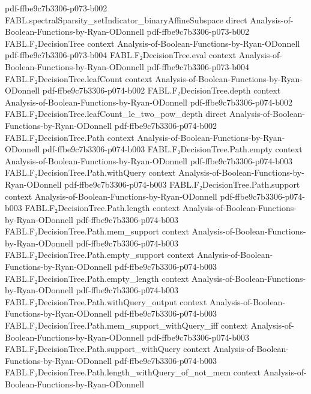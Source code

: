 \begin{theorem}
  {pdf-ffbe9c7b3306-p073-b002}
\proofstep
  {FABL.spectralSparsity_setIndicator_binaryAffineSubspace}
  {direct}
  {Analysis-of-Boolean-Functions-by-Ryan-ODonnell}
  {pdf-ffbe9c7b3306-p073-b002}
\proofstep
  {FABL.F₂DecisionTree}
  {context}
  {Analysis-of-Boolean-Functions-by-Ryan-ODonnell}
  {pdf-ffbe9c7b3306-p073-b004}
\proofstep
  {FABL.F₂DecisionTree.eval}
  {context}
  {Analysis-of-Boolean-Functions-by-Ryan-ODonnell}
  {pdf-ffbe9c7b3306-p073-b004}
\proofstep
  {FABL.F₂DecisionTree.leafCount}
  {context}
  {Analysis-of-Boolean-Functions-by-Ryan-ODonnell}
  {pdf-ffbe9c7b3306-p074-b002}
\proofstep
  {FABL.F₂DecisionTree.depth}
  {context}
  {Analysis-of-Boolean-Functions-by-Ryan-ODonnell}
  {pdf-ffbe9c7b3306-p074-b002}
\proofstep
  {FABL.F₂DecisionTree.leafCount_le_two_pow_depth}
  {direct}
  {Analysis-of-Boolean-Functions-by-Ryan-ODonnell}
  {pdf-ffbe9c7b3306-p074-b002}
\proofstep
  {FABL.F₂DecisionTree.Path}
  {context}
  {Analysis-of-Boolean-Functions-by-Ryan-ODonnell}
  {pdf-ffbe9c7b3306-p074-b003}
\proofstep
  {FABL.F₂DecisionTree.Path.empty}
  {context}
  {Analysis-of-Boolean-Functions-by-Ryan-ODonnell}
  {pdf-ffbe9c7b3306-p074-b003}
\proofstep
  {FABL.F₂DecisionTree.Path.withQuery}
  {context}
  {Analysis-of-Boolean-Functions-by-Ryan-ODonnell}
  {pdf-ffbe9c7b3306-p074-b003}
\proofstep
  {FABL.F₂DecisionTree.Path.support}
  {context}
  {Analysis-of-Boolean-Functions-by-Ryan-ODonnell}
  {pdf-ffbe9c7b3306-p074-b003}
\proofstep
  {FABL.F₂DecisionTree.Path.length}
  {context}
  {Analysis-of-Boolean-Functions-by-Ryan-ODonnell}
  {pdf-ffbe9c7b3306-p074-b003}
\proofstep
  {FABL.F₂DecisionTree.Path.mem_support}
  {context}
  {Analysis-of-Boolean-Functions-by-Ryan-ODonnell}
  {pdf-ffbe9c7b3306-p074-b003}
\proofstep
  {FABL.F₂DecisionTree.Path.empty_support}
  {context}
  {Analysis-of-Boolean-Functions-by-Ryan-ODonnell}
  {pdf-ffbe9c7b3306-p074-b003}
\proofstep
  {FABL.F₂DecisionTree.Path.empty_length}
  {context}
  {Analysis-of-Boolean-Functions-by-Ryan-ODonnell}
  {pdf-ffbe9c7b3306-p074-b003}
\proofstep
  {FABL.F₂DecisionTree.Path.withQuery_output}
  {context}
  {Analysis-of-Boolean-Functions-by-Ryan-ODonnell}
  {pdf-ffbe9c7b3306-p074-b003}
\proofstep
  {FABL.F₂DecisionTree.Path.mem_support_withQuery_iff}
  {context}
  {Analysis-of-Boolean-Functions-by-Ryan-ODonnell}
  {pdf-ffbe9c7b3306-p074-b003}
\proofstep
  {FABL.F₂DecisionTree.Path.support_withQuery}
  {context}
  {Analysis-of-Boolean-Functions-by-Ryan-ODonnell}
  {pdf-ffbe9c7b3306-p074-b003}
\proofstep
  {FABL.F₂DecisionTree.Path.length_withQuery_of_not_mem}
  {context}
  {Analysis-of-Boolean-Functions-by-Ryan-ODonnell}

\end{theorem}
